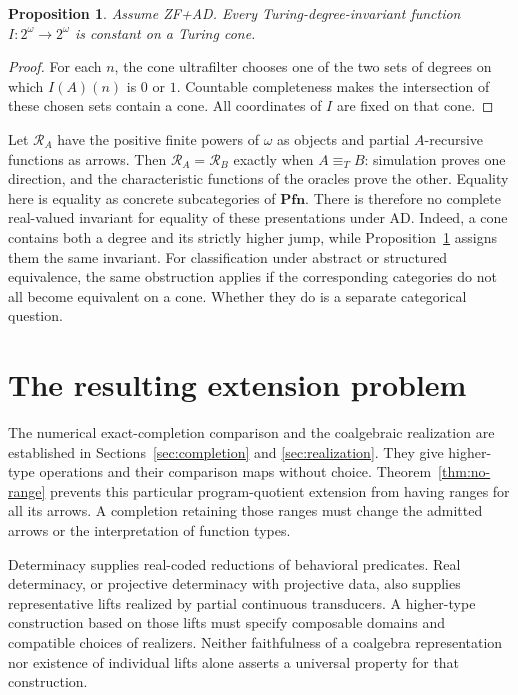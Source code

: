 \documentclass[11pt]{article}
\newtheorem{proposition}[theorem]{Proposition}
\theoremstyle{definition}
\newcommand{\N}{\omega}
\newcommand{\Rcat}{\mathcal R}
\begin{document}
\begin{proposition}\label{prop:cone-invariant}
Assume ZF+AD. Every Turing-degree-invariant function
$I:2^\N\to2^\N$ is constant on a Turing cone.
\end{proposition}
\begin{proof}
For each $n$, the cone ultrafilter chooses one of the two sets of
degrees on which $I(A)(n)$ is $0$ or $1$. Countable completeness
makes the intersection of these chosen sets contain a cone. All
coordinates of $I$ are fixed on that cone.
\end{proof}

Let $\Rcat_A$ have the positive finite powers of $\N$ as objects
and partial $A$-recursive functions as arrows. Then
$\Rcat_A=\Rcat_B$ exactly when $A\equiv_T B$:
simulation proves one direction, and the characteristic functions
of the oracles prove the other. Equality here is equality as concrete
subcategories of $\mathbf{Pfn}$. There is therefore no complete
real-valued invariant for equality of these presentations under AD.
Indeed, a cone contains both a degree and its strictly higher jump,
while Proposition~\ref{prop:cone-invariant} assigns them the same
invariant. For classification under abstract or structured equivalence,
the same obstruction applies if the corresponding categories do not
all become equivalent on a cone. Whether they do is a separate
categorical question.

\section{The resulting extension problem}

The numerical exact-completion comparison and the coalgebraic
realization are established in Sections~\ref{sec:completion} and
\ref{sec:realization}. They give higher-type operations and their
comparison maps without choice. Theorem~\ref{thm:no-range} prevents
this particular program-quotient extension from having ranges for
all its arrows. A completion retaining those ranges must change
the admitted arrows or the interpretation of function types.

Determinacy supplies real-coded reductions of behavioral predicates.
Real determinacy, or projective determinacy with projective data,
also supplies representative lifts realized by partial continuous
transducers. A higher-type construction based on those lifts must
specify composable domains and compatible choices of realizers.
Neither faithfulness of a coalgebra representation nor existence of
individual lifts alone asserts a universal property for that
construction.
\end{document}
